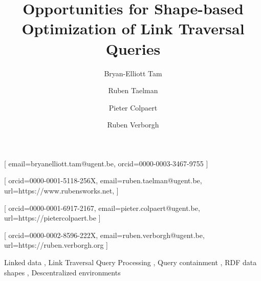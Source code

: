 \documentclass[
]{ceurart}
\begin{document}


\title{Opportunities for Shape-based Optimization of Link Traversal Queries}


\author[1]{Bryan-Elliott Tam}[%
email=bryanelliott.tam@ugent.be,
orcid=0000-0003-3467-9755
]
\cormark[1]

\author[1]{Ruben Taelman}[%
orcid=0000-0001-5118-256X,
email=ruben.taelman@ugent.be,
url=https://www.rubensworks.net,
]
\author[1]{Pieter Colpaert}[%
orcid=0000-0001-6917-2167,
email=pieter.colpaert@ugent.be,
url=https://pietercolpaert.be
]
\author[1]{Ruben Verborgh}[%
orcid=0000-0002-8596-222X,
email=ruben.verborgh@ugent.be,
url=https://ruben.verborgh.org
]



\address[1]{IDLab,
Department of Electronics and Information Systems, Ghent University – imec}

\begin{keywords}
  Linked data \sep
  Link Traversal Query Processing \sep
  Query containment \sep
  RDF data shapes \sep
  Descentralized environments
\end{keywords}

\maketitle









\end{document}
